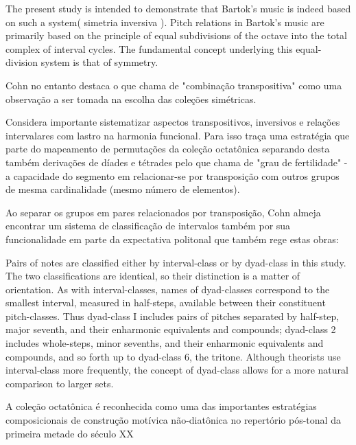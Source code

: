 \documentclass[
	12pt,				%
	openright,			%
	twoside,			%
	a4paper,			%
	english,			%
	french,				%
	spanish,			%
	brazil				%
	]{abntex2}
\begin{document}
\begin{citacao}
The present study is intended to demonstrate that
Bartok's music is indeed based on such a system( simetria inversiva ). Pitch relations
in Bartok's music are primarily based on the principle of equal subdivisions of the octave into the total complex of interval cycles. The fundamental concept underlying
this equal-division system is that of symmetry. \cite{cohn1988inversional}
\end{citacao}

Cohn no entanto destaca o que chama de "combinação transpositiva" como uma observação a ser tomada na escolha das coleções simétricas.

Considera importante sistematizar aspectos transpositivos, inversivos e relações intervalares com lastro na harmonia funcional. Para isso traça uma estratégia que parte do mapeamento de permutações da coleção octatônica separando desta também derivações de díades e tétrades pelo que chama de "grau de fertilidade"\cite[ p.268]{cohn1991bartok} - a capacidade do segmento em relacionar-se por transposição com outros grupos de mesma cardinalidade (mesmo número de elementos).

Ao separar os grupos em pares relacionados por transposição, Cohn almeja encontrar um sistema de classificação de intervalos também por sua funcionalidade em parte da expectativa politonal que também rege estas obras:

\begin{citacao}
Pairs of notes are classified either by interval-class or by dyad-class in this study.
The two classifications are identical, so their distinction is a matter of orientation. As
with interval-classes, names of dyad-classes correspond to the smallest interval, measured in half-steps, available between their constituent pitch-classes. Thus dyad-class I includes pairs of pitches separated by half-step, major seventh, and their enharmonic equivalents and compounds; dyad-class 2 includes whole-steps, minor sevenths, and their enharmonic equivalents and compounds, and so forth up to
dyad-class 6, the tritone. Although theorists use interval-class more frequently, the
concept of dyad-class allows for a more natural comparison to larger sets.
\cite[ p.265-266]{cohn1991bartok}
\end{citacao}

A coleção octatônica é reconhecida como uma das importantes estratégias composicionais de construção motívica não-diatônica no repertório pós-tonal da primeira metade do século XX \cite{berger1963problems,antokoletz1984music,lester1989analytic,forte1991debussy,straus2004,de2013simetria}
\end{document}
